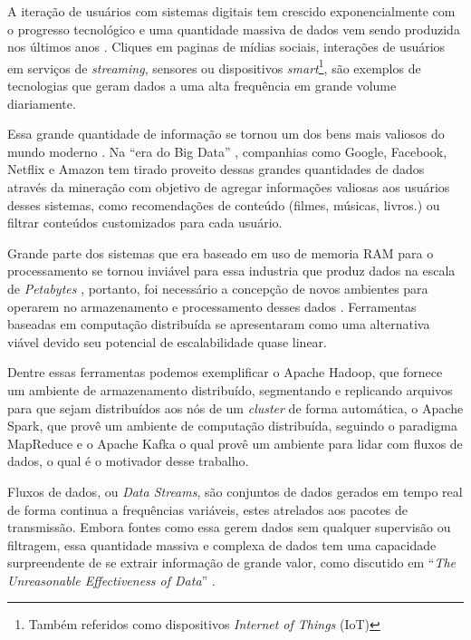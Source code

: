 A iteração de usuários com sistemas digitais tem crescido exponencialmente com o progresso tecnológico \cite{dean2008mapreduce} e uma quantidade massiva de dados vem sendo produzida nos últimos anos \cite{halevy2009unreasonable}. Cliques em paginas de mídias sociais, interações de usuários em serviços de \textit{streaming}, sensores ou dispositivos \textit{smart}\footnote{Também referidos como dispositivos \textit{Internet of Things} (IoT)}, são exemplos de tecnologias que geram dados a uma alta frequência em grande volume diariamente.

Essa grande quantidade de informação se tornou um dos bens mais valiosos do mundo moderno \cite{economist2017world}. Na ``era do Big Data'' \cite{tarnoff2018big, finger2014data}, companhias como Google\textsuperscript{\tiny\textregistered}, Facebook\textsuperscript{\tiny\textregistered}, Netflix\textsuperscript{\tiny\textregistered} e Amazon\textsuperscript{\tiny\textregistered} tem tirado proveito dessas grandes quantidades de dados através da mineração com objetivo de agregar informações valiosas aos usuários desses sistemas, como recomendações de conteúdo (filmes, músicas, livros.) ou filtrar conteúdos customizados para cada usuário.

Grande parte dos sistemas que era baseado em uso de memoria RAM para o processamento se tornou inviável para essa industria que produz dados na escala de \textit{Petabytes} \cite{dean2008mapreduce}, portanto, foi necessário a concepção de novos ambientes para operarem no armazenamento e processamento desses dados \cite{gama2007learning}. Ferramentas baseadas em computação distribuída se apresentaram como uma alternativa viável devido seu potencial de escalabilidade quase linear.

Dentre essas ferramentas podemos exemplificar o Apache Hadoop\textsuperscript{\tiny\textregistered}, que fornece um ambiente de armazenamento distribuído, segmentando e replicando arquivos para que sejam distribuídos aos nós de um \textit{cluster} de forma automática, o Apache Spark\textsuperscript{\tiny\textregistered}, que provê um ambiente de computação distribuída, seguindo o paradigma MapReduce e o Apache Kafka\textsuperscript{\tiny\textregistered} o qual provê um ambiente para lidar com fluxos de dados, o qual é o motivador desse trabalho.

Fluxos de dados, ou \textit{Data Streams}, são conjuntos de dados gerados em tempo real de forma continua a frequências variáveis, estes atrelados aos pacotes de transmissão. Embora fontes como essa gerem dados sem qualquer supervisão ou filtragem, essa quantidade massiva e complexa de dados tem uma capacidade surpreendente de se extrair informação de grande valor, como discutido em ``\textit{The Unreasonable Effectiveness of Data}'' \cite{halevy2009unreasonable}.


